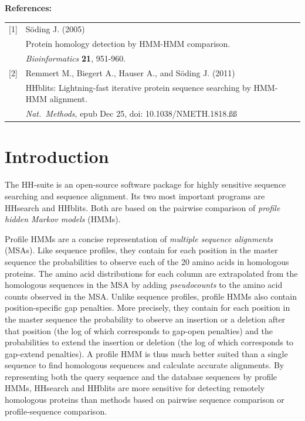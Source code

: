 \documentclass[11pt,a4paper]{article}
\begin{document}
{\bf References:}


\begin{tabular}[t]{ll}
[1] & S\"oding J. (2005)\\ 
    & Protein homology detection by HMM-HMM comparison.\\
    & {\it Bioinformatics} {\bf 21}, 951-960.\\[2mm]

[2] & Remmert M., Biegert A., Hauser A., and S\"oding J. (2011) \\
    & HHblits: Lightning-fast iterative protein sequence searching by HMM-HMM alignment. \\
    & {\it Nat.\  Methods}, epub Dec 25, doi: 10.1038/NMETH.1818.ßß
\end{tabular}



\newpage

\setlength{\parskip}{0mm}
\tableofcontents
\setlength{\parskip}{2mm}

\newpage

\section{Introduction}
The HH-suite is an open-source software package for highly sensitive sequence searching and sequence alignment. Its two most important programs are HHsearch and HHblits. Both are based on the pairwise comparison of \textit{profile hidden Markov models} (HMMs). 

Profile HMMs are a concise representation of \textit{multiple sequence alignments} (MSAs). Like sequence profiles, they contain for each position in the master sequence the probabilities to observe each of the 20 amino acids in homologous proteins. The amino acid distributions for each column are extrapolated from the homologous sequences in the MSA by adding \textit{pseudocounts} to the amino acid counts observed in the MSA. Unlike sequence profiles, profile HMMs also contain position-specific gap penalties. More precisely, they contain for each position in the master sequence the probability to observe an insertion or a deletion after that position (the log of which corresponds to gap-open penalties) and the probabilities to extend the insertion or deletion (the log of which corresponds to gap-extend penalties). A profile HMM is thus much better suited than a single sequence to find homologous sequences and calculate accurate alignments. By representing both the query sequence and the database sequences by profile HMMs, HHsearch and HHblits are more sensitive for detecting remotely homologous proteins than methods based on pairwise sequence comparison or profile-sequence comparison.
\end{document}
